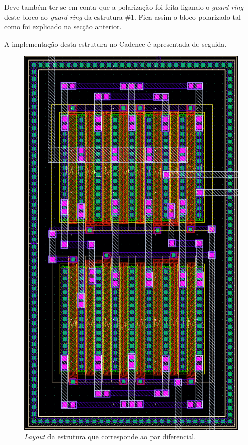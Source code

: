 \documentclass[11pt]{article}
\numberwithin{equation}{section}
\begin{document}
Deve também ter-se em conta que a polarização foi feita ligando o \textit{guard ring} deste bloco ao \textit{guard ring} da estrutura \#1. Fica assim o bloco polarizado tal como foi explicado na secção anterior.

A implementação desta estrutura no Cadence é apresentada de seguida.

\begin{figure}[H]
	\centering
	\includegraphics[keepaspectratio=true, scale=0.65]{exps/layout/pardiferencial}
	\vspace{-0.5em}
	\caption{\textit{Layout} da estrutura que corresponde ao par diferencial.}
	\vspace{-0.8em}
\end{figure}
\end{document}
